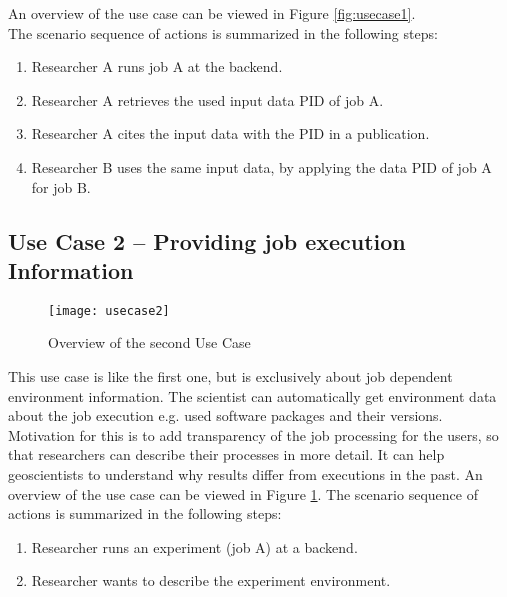 \documentclass[draft,final]{vutinfth} %
\begin{document}
An overview of the use case can be viewed in Figure \ref{fig:usecase1}. \\

The scenario sequence of actions is summarized in the following steps: \\

\begin{enumerate}
	\item Researcher A runs job A at the backend.
	\item Researcher A retrieves the used input data PID of job A.
	\item Researcher A cites the input data with the PID in a publication.
	\item Researcher B uses the same input data, by applying the data PID of job A for job B.  
\end{enumerate}

\subsection{Use Case 2 – Providing job execution Information}\label{UseCase2}
\begin{figure}[h]
	\centering
	\texttt{[image: usecase2]}
	\caption{Overview of the second Use Case}
	\label{fig:usecase2} %
\end{figure}

This use case is like the first one, but is exclusively about job dependent environment information. The scientist can automatically get environment data about the job execution e.g. used software packages and their versions. Motivation for this is to add transparency of the job processing for the users, so that researchers can describe their processes in more detail. It can help geoscientists to understand why results differ from executions in the past. An overview of the use case can be viewed in Figure \ref{fig:usecase2}. 
The scenario sequence of actions is summarized in the following steps: \\
\begin{enumerate}
	\item Researcher runs an experiment (job A) at a backend.
	\item Researcher wants to describe the experiment environment.
\end{enumerate}
\end{document}
